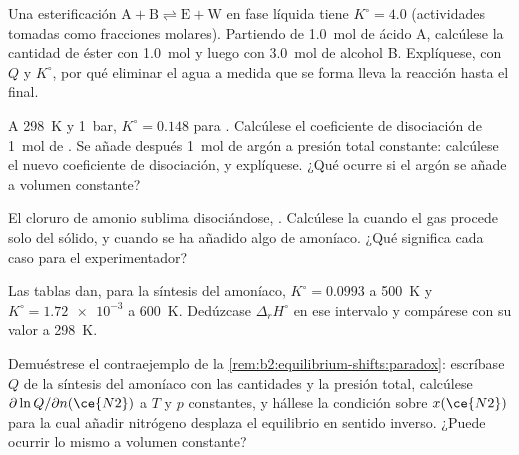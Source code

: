\begin{exercise}[$\star\star$]\label{exo:b2:equilibrium-shifts:6}
Una esterificación $\mathrm{A + B \rightleftharpoons E + W}$ en fase líquida
tiene $K^\circ = 4.0$ (actividades tomadas como fracciones molares). Partiendo de
\qty{1.0}{mol} de ácido A, calcúlese la cantidad de éster con \qty{1.0}{mol} y luego
con \qty{3.0}{mol} de alcohol B. Explíquese, con $Q$ y $K^\circ$, por qué eliminar el
agua a medida que se forma lleva la reacción hasta el final.
\end{exercise}

\begin{exercise}[$\star\star$]\label{exo:b2:equilibrium-shifts:7}
A \qty{298}{K} y \qty{1}{bar}, $K^\circ = 0.148$ para .
Calcúlese el coeficiente de disociación de \qty{1}{mol} de . Se añade después
\qty{1}{mol} de argón a presión total constante: calcúlese el nuevo
coeficiente de disociación, y explíquese. ¿Qué ocurre si el argón se añade a
volumen constante?
\end{exercise}

\begin{exercise}[$\star\star$]\label{exo:b2:equilibrium-shifts:8}
El cloruro de amonio sublima disociándose, . Calcúlese la  cuando el gas procede solo del sólido, y cuando
se ha añadido algo de amoníaco. ¿Qué significa cada caso para el experimentador?
\end{exercise}

\begin{exercise}[$\star\star$]\label{exo:b2:equilibrium-shifts:9}
Las tablas dan, para la síntesis del amoníaco, $K^\circ = 0.0993$ a \qty{500}{K} y
$K^\circ = \num{1.72e-3}$ a \qty{600}{K}. Dedúzcase $\Delta_r H^\circ$ en ese
intervalo y compárese con su valor a \qty{298}{K}.
\end{exercise}

\begin{exercise}[$\star\star\star$]\label{exo:b2:equilibrium-shifts:10}
Demuéstrese el contraejemplo de la \cref{rem:b2:equilibrium-shifts:paradox}: escríbase
$Q$ de la síntesis del amoníaco con las cantidades y la presión total, calcúlese
$\partial\ln Q/\partial n(\ce{N2})$ a $T$ y $p$ constantes, y hállese la
condición sobre $x(\ce{N2})$ para la cual añadir nitrógeno desplaza el equilibrio
en sentido inverso. ¿Puede ocurrir lo mismo a volumen constante?
\end{exercise}

